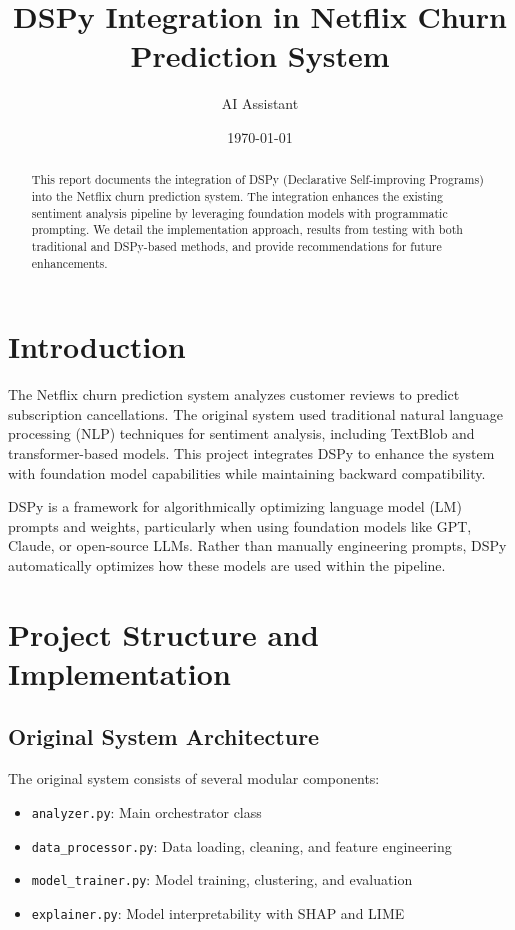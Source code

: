 \documentclass[11pt]{article}
\title{DSPy Integration in Netflix Churn Prediction System}
\author{AI Assistant}
\date{\today}
\begin{document}
\maketitle

\begin{abstract}
This report documents the integration of DSPy (Declarative Self-improving Programs) into the Netflix churn prediction system. The integration enhances the existing sentiment analysis pipeline by leveraging foundation models with programmatic prompting. We detail the implementation approach, results from testing with both traditional and DSPy-based methods, and provide recommendations for future enhancements.
\end{abstract}

\tableofcontents
\newpage

\section{Introduction}

The Netflix churn prediction system analyzes customer reviews to predict subscription cancellations. The original system used traditional natural language processing (NLP) techniques for sentiment analysis, including TextBlob and transformer-based models. This project integrates DSPy to enhance the system with foundation model capabilities while maintaining backward compatibility.

DSPy is a framework for algorithmically optimizing language model (LM) prompts and weights, particularly when using foundation models like GPT, Claude, or open-source LLMs. Rather than manually engineering prompts, DSPy automatically optimizes how these models are used within the pipeline.

\section{Project Structure and Implementation}

\subsection{Original System Architecture}

The original system consists of several modular components:
\begin{itemize}
    \item \texttt{analyzer.py}: Main orchestrator class
    \item \texttt{data\_processor.py}: Data loading, cleaning, and feature engineering
    \item \texttt{model\_trainer.py}: Model training, clustering, and evaluation
    \item \texttt{explainer.py}: Model interpretability with SHAP and LIME
\end{itemize}
\end{document}
